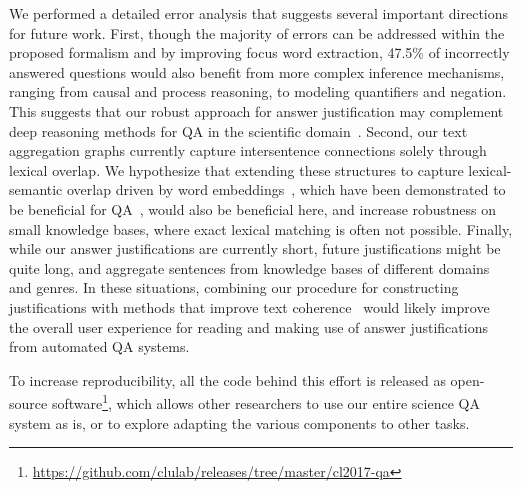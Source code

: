 We performed a detailed error analysis that suggests several important directions for future work. 
First, though the majority of errors can be addressed within the proposed formalism and by improving focus word extraction, 47.5\% of incorrectly answered questions would also benefit from more complex inference mechanisms, ranging from causal and process reasoning, to modeling quantifiers and negation.
This suggests that our robust approach for answer justification may complement deep reasoning methods for QA in the scientific domain~\cite{baral2011towards}.
Second, our text aggregation graphs currently capture intersentence connections solely through lexical overlap. We hypothesize that extending these structures to capture lexical-semantic overlap driven by word embeddings~\cite{mikolov13}, which have been demonstrated to be beneficial for QA~\cite{yih13,jansen14,fried2015higher}, would also be beneficial here, and increase robustness on small knowledge bases, where exact lexical matching is often not possible. 
Finally, while our answer justifications are currently short, future justifications might be quite long, and aggregate sentences from knowledge bases of different domains and genres.  In these situations, combining our procedure for constructing justifications with methods that improve text coherence~\cite{barzilay2008modeling} would likely improve the overall user experience for reading and making use of answer justifications from automated QA systems. 

To increase reproducibility, all the code behind this effort is released as open-source software\footnote{\url{https://github.com/clulab/releases/tree/master/cl2017-qa}}, which allows other researchers to use our entire science QA system as is, or to explore adapting the various components to other tasks. 
